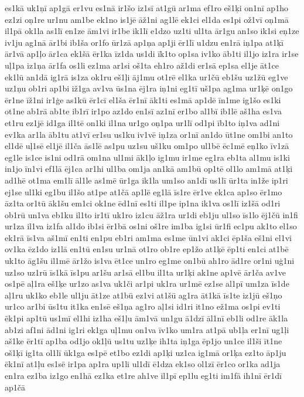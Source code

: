 {es1kā
uk1ņī
ap1gā
er1vu
es1nā
ir1šo
iz1sī
at1gū
ar1ma
ef1ro
eš1ķi
on1nī
ap1ho
ez1zi
oņ1re
ur1nu
am1be
ek1no
is1jē
āž1ni
ag1lē
ek1ci
el1da
es1pi
ož1vī
oņ1mā
il1pā
ok1la
as1lī
en1ze
ām1vi
ir1be
ik1lī
e1dzo
uz1ti
ul1ta
ār1gu
an1so
ik1si
eņ1ze
iv1ju
ag1nā
ār1bi
ib1ša
or1fo
ūr1zā
ap1ņa
ap1ji
ēr1lī
u1dzu
en1rā
iņ1pa
at1ķī
ār1vā
ap1ļo
ār1ca
ek1šā
ēr1ka
īz1da
us1di
īk1to
op1sa
iv1ko
āb1ti
il1jo
iz1ra
ir1se
uļ1pa
iz1ņa
ār1fa
os1li
ez1ma
ar1si
oš1ta
eh1ro
až1di
er1sā
ep1sa
el1je
āt1ce
ek1lū
an1dā
ig1rā
is1za
ok1ru
eš1ļi
āj1mu
ot1rē
el1ka
ur1čū
eb1šu
uz1žū
eg1ve
uz1ņu
ob1ri
ap1bi
iž1ga
av1va
ūs1na
ēj1ra
iņ1ni
eg1tī
uš1pa
ag1ma
ur1ķē
on1go
ēr1ne
īž1ni
ir1ģe
as1kū
ēr1cī
el1ša
ēr1nī
āk1ti
es1mā
ap1dē
īn1me
ig1šo
es1ki
ot1ne
ab1rā
ab1te
ib1rī
ir1po
az1do
en1sī
az1nī
er1bo
al1bī
ib1lē
aš1ha
es1va
et1ru
ez1jē
id1ga
il1tē
on1ki
il1na
ur1go
oņ1pa
ur1lī
od1pi
īb1to
iņ1va
ad1ni
ev1ka
ar1la
āb1tu
at1vī
er1su
us1ku
iv1vē
iņ1za
or1nī
an1do
ūt1ne
om1bi
an1to
el1dē
uļ1sē
el1jē
il1ča
ās1lē
as1pu
uz1su
uš1ku
om1po
ul1bē
ēc1mē
eņ1ko
īv1zā
eg1le
is1ce
is1ni
od1rā
om1na
ul1mi
āk1ļo
ig1mu
ir1me
eg1ra
eb1ta
al1mu
is1ki
in1jo
īn1vi
ef1lā
ēj1ca
ar1hi
ul1ba
om1ja
an1kā
am1bū
op1tē
ol1lo
am1mā
at1ķi
ad1hē
ot1ma
em1lī
āl1le
as1mē
ūr1ga
ik1la
um1so
an1dī
us1lī
ūr1ta
in1že
ip1ri
ej1se
ul1ki
eg1bu
il1šo
at1pe
at1čā
ap1lē
eg1lā
īs1re
ēr1ve
ek1ca
ap1so
ēr1mo
āz1ta
or1tū
āk1šu
em1ci
ok1ne
ēd1nī
es1ti
il1pe
ip1na
ik1va
os1lī
iz1šā
od1ri
ob1rū
un1va
eb1ku
il1to
ir1tī
uk1ro
iz1cu
āž1ra
ur1di
eb1ju
ul1so
īs1lo
ēj1čū
in1fi
ur1za
il1va
iz1fa
al1do
ib1si
ēr1bā
os1ni
oš1re
im1ba
ig1si
ūr1fi
ec1pu
ak1to
el1so
ek1rā
īs1va
aš1mī
en1ti
en1pu
eb1ri
am1ma
es1me
ūn1vi
ak1ci
ēp1ša
eš1ni
el1vi
ov1ka
ēz1do
iz1lā
en1tū
en1su
ur1nā
ot1ro
ob1re
ep1žo
at1ķē
ēp1ti
en1ci
at1bē
uk1to
āg1šu
il1mē
ār1žo
is1va
ēt1ce
un1ro
eg1me
on1bū
ah1ro
ād1re
or1ni
uģ1ni
uz1so
uz1rū
īs1kā
īs1pu
ar1šu
ar1sā
el1bu
il1ta
ur1ķi
ak1ne
ap1vē
ār1ča
av1ve
os1pē
aļ1ra
eš1ķe
ur1zo
as1va
uk1či
ar1pi
uk1ra
ur1mē
ez1se
al1pī
um1za
īs1de
aļ1ru
uk1ko
eb1le
ul1ju
āt1ze
at1bū
ez1vi
at1šū
ag1ra
āt1kā
īs1te
iz1jū
eš1ņo
ur1co
ar1bi
ūs1tu
it1ka
en1sē
eš1ņa
ag1ro
aļ1si
id1ri
it1no
ež1ma
os1pi
ev1ti
ēk1pi
ap1tū
us1mī
el1hi
iz1ha
eš1ļu
ām1vā
un1gu
ā1dzī
āl1nī
eb1li
od1re
āk1la
ab1zi
af1ni
ād1ni
ig1ri
ek1ga
uļ1mu
on1va
īv1ko
um1ra
at1pā
ub1ļa
er1nī
ug1ļi
aš1ke
ēr1tī
ap1ba
od1jo
ok1ļū
us1tu
uz1ķe
ih1ta
iņ1ga
ēp1jo
un1ce
il1ši
īt1ne
oš1ķī
ig1ta
ol1lī
ūk1ga
es1pē
et1bo
ez1di
ap1ķi
uz1ca
ig1mā
or1ķa
ez1to
āp1ju
ēk1nī
at1ļu
es1sē
ir1pa
ap1ra
up1li
ul1dī
ē1dza
ek1so
ol1zī
ēr1co
or1ka
ad1ja
en1ra
ez1ba
iz1go
en1hā
ez1ka
et1re
ah1ve
il1pī
ep1lu
eg1ti
im1fā
ih1nī
ēr1dī
ap1čā
}
